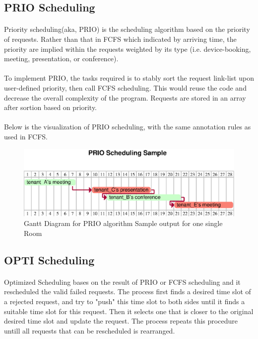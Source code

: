 \documentclass{article}
\begin{document}
        \subsection{PRIO Scheduling}
            \paragraph{}
            Priority scheduling(aka, PRIO) is the scheduling algorithm based on the
                priority of requests. Rather than that in FCFS which indicated by arriving time, the priority are implied within the requests weighted by its type (i.e. device-booking, meeting, presentation, or conference). 
            \paragraph{}
            To implement PRIO, the tasks required is to stably sort the request link-list upon user-defined priority, then call FCFS scheduling. This would reuse the code and decrease the overall complexity of the program.
                Requests are stored in an array after sortion based on priority. 
            \paragraph{}
            Below is the visualization of PRIO scheduling, with the same annotation rules as used in FCFS.
            \begin{figure}[!htbp]
                \centering
                \includegraphics[scale=0.7]{eps/prio_scheduling.eps}
                \caption{Gantt Diagram for PRIO algorithm Sample output for one single Room}
            \end{figure}
        \subsection{OPTI Scheduling}
            \paragraph{}
                Optimized Scheduling bases on the result of PRIO or FCFS scheduling and it rescheduled the valid failed requests. The process first finds a desired time slot  of a rejected request, and try to "push" this time slot to both sides until it finds a suitable time slot for this request. Then it selects one that is closer to the original desired time slot and update the request. The process repeats this procedure untill all requests that can be rescheduled is rearranged.
    \cleardoublepage
\end{document}
